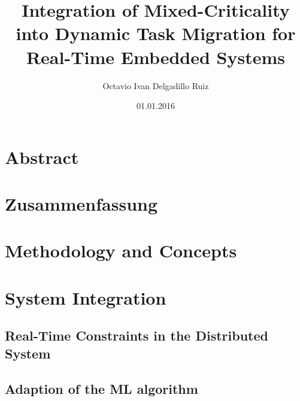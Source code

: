 \documentclass[%
]{tumDiss}
\title{%
  Integration of Mixed-Criticality into Dynamic Task Migration for Real-Time Embedded Systems
}
\author{Octavio Ivan Delgadillo Ruiz}
\date{01.01.2016}
\begin{document}
\frontmatter
\maketitle

\chapter{Abstract}

\lipsum[1-4]



\chapter{Zusammenfassung}

\lipsum[1-4]



\tableofcontents
\listoffigures
\listoftables
\printglossary[type=\acronymtype, nonumberlist]



\mainmatter





\chapter{Methodology and Concepts}







\chapter{System Integration}
\section{Real-Time Constraints in the Distributed System}
\section{Adaption of the ML algorithm}
\end{document}
